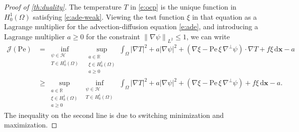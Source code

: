 \documentclass[10pt,a4paper]{amsart}
\newcommand{\Pe}{\mathrm{Pe}}
\newcommand{\R}{\mathbb{R}}
\newcommand{\abs}[1]{\left\vert #1 \right\vert}
\newcommand{\avg}[1]{\int_\Omega #1 \,\dx}
\newcommand{\cal}[1]{\mathcal{#1}}
\newcommand{\dx}{\mathrm{d} \vec{x}}
\newcommand{\norm}[1]{\left\| #1 \right\|}
\newcommand{\ocpval}{\mathcal{J}}
\renewcommand{\vec}[1]{\mathbf{#1}}
\begin{document}
\begin{proof}[Proof of \cref{th:duality}]
    The temperature $T$ in \cref{e:ocp} is the unique function in $H^1_0(\Omega)$ satisfying \cref{e:ade-weak}. Viewing the test function $\xi$ in that equation as a Lagrange multiplier for the advection-diffusion equation \cref{e:ade}, and introducing a Lagrange multiplier $a\geq 0$ for the constraint $\norm{\nabla\psi}_{L^2}\leq 1$, we can write
    \begin{align*}
        \ocpval(\Pe)
        &= 
        \inf_{\substack{
        \psi \in \cal{H} \\ 
        T \in H^1_0(\Omega)
        }}\;
        \sup_{\substack{a \in \R \\ \xi \in H^1_0(\Omega) \\ a\geq 0}}
        \avg{\abs{\nabla T}^2 + a |\nabla \psi|^2 + (\nabla\xi - \Pe\,\xi\,\nabla^\perp\psi )\cdot \nabla T + f\xi} - a
        \\
        &\geq 
        \sup_{\substack{a \in \R \\ \xi \in H^1_0(\Omega) \\ a\geq 0}}
        \inf_{\substack{
        \psi \in \cal{H} \\ 
        T \in H^1_0(\Omega)
        }}\;
        \avg{\abs{\nabla T}^2 + a |\nabla \psi|^2 + (\nabla\xi - \Pe\,\xi\,\nabla^\perp\psi ) + f\xi} - a.
    \end{align*}
    The inequality on the second line is due to switching minimization and maximization.


\end{proof}
\end{document}
